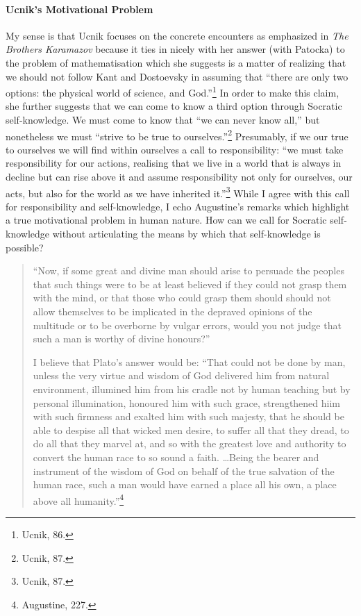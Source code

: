 \documentclass[12pt]{article}
\begin{document}
	\paragraph*{Ucnik's Motivational Problem} My sense is that Ucnik focuses on the concrete encounters as emphasized in \emph{The Brothers Karamazov} because it ties in nicely with her answer (with Patocka) to the problem of mathematisation which she suggests is a matter of realizing that we should not follow Kant and Dostoevsky in assuming that ``there are only two options: the physical world of science, and God.''\footnote{Ucnik, 86.} In order to make this claim, she further suggests that we can come to know a third option through Socratic self-knowledge. We must come to know that ``we can never know all,'' but nonetheless we must ``strive to be true to ourselves.''\footnote{Ucnik, 87.} Presumably, if we our true to ourselves we will find within ourselves a call to responsibility: ``we must take responsibility for our actions, realising that we live in a world that is always in decline but can rise above it and assume responsibility not only for ourselves, our acts, but also for the world as we have inherited it.''\footnote{Ucnik, 87.} While I agree with this call for responsibility and self-knowledge, I echo Augustine's remarks which highlight a true motivational problem in human nature. How can we call for Socratic self-knowledge without articulating the means by which that self-knowledge is possible?
	
	\begin{quote}
	\singlespacing
	\footnotesize
	
	``Now, if some great and divine man should arise to persuade the peoples that such things were to be at least believed if they could not grasp them with the mind, or that those who could grasp them should should not allow themselves to be implicated in the depraved opinions of the multitude or to be overborne by vulgar errors, would you not judge that such a man is worthy of divine honours?''
	
	I believe that Plato's answer would be: ``That could not be done by man, unless the very virtue and wisdom of God delivered him from natural environment, illumined him from his cradle not by human teaching but by personal illumination, honoured him with such grace, strengthened hiim with such firmness and exalted him with such majesty, that he should be able to despise all that wicked men desire, to suffer all that they dread, to do all that they marvel at, and so with the greatest love and authority to convert the human race to so sound a faith. \ldots Being the bearer and instrument of the wisdom of God on behalf of the true salvation of the human race, such a man would have earned a place all his own, a place above all humanity.''\footnote{Augustine, 227.}
	
	\end{quote}
	
\end{document}
